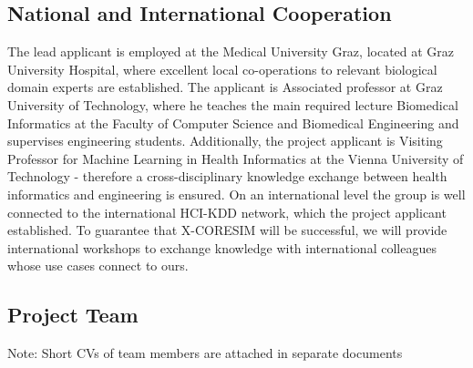 \documentclass[a4paper,11pt]{article}
\begin{document}
\subsection{National and International Cooperation}

The lead applicant is employed at the Medical University Graz, located at Graz University Hospital, where excellent local co-operations to relevant biological domain experts are established. The applicant is Associated professor at Graz University of Technology, where he teaches the main required lecture Biomedical Informatics at the Faculty of Computer Science and Biomedical Engineering and supervises engineering students. Additionally, the project applicant is Visiting Professor for Machine Learning in Health Informatics at the Vienna University of Technology - therefore a cross-disciplinary knowledge exchange between health informatics and engineering is ensured. On an international level the group is well connected to the international HCI-KDD network, which the project applicant established. To guarantee that X-CORESIM will be successful, we will provide international workshops to exchange knowledge with international colleagues whose use cases connect to ours.

\subsection{Project Team}
Note: Short CVs of team members are attached in separate documents
\end{document}
